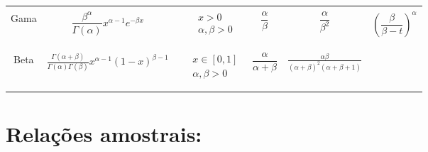 \documentclass[12pt]{article}
\begin{document}
\begin{tabular}{| c | c | c | c | c | c | c |}
	\rule{0pt}{0pt} & & & & & & \\ \hline \rule{0pt}{0pt} & & & & & & \\

	Gama &
	$\dfrac{\beta ^ \alpha}{\Gamma(\alpha)} x^{\alpha - 1} e^{-\beta x}$ &
	&
	$\begin{matrix}
		x             > 0 \\
		\alpha,\beta  > 0 \\
	\end{matrix}$ &
	$\dfrac{\alpha}{\beta}$ &
	$\dfrac{\alpha}{\beta^2}$ &
	$\left( \dfrac{\beta}{\beta - t} \right)^\alpha$ \\

	\rule{0pt}{0pt} & & & & & & \\ \hline \rule{0pt}{0pt} & & & & & & \\

	Beta &
	$\frac{\Gamma(\alpha + \beta)}{\Gamma(\alpha) \Gamma(\beta)} x^{\alpha - 1} (1-x)^{\beta - 1}$ &
	&
	$\begin{matrix}
		x \in [0,1] \\
		\alpha,\beta  > 0 \\
	\end{matrix}$ &
	$\dfrac{\alpha}{\alpha + \beta}$ &
	$\frac{\alpha \beta}{(\alpha + \beta)^2 (\alpha +  \beta + 1)}$ &
	\\

	\rule{0pt}{0pt} & & & & & & \\ \hline

\end{tabular}

\section{Relações amostrais:}
\end{document}
